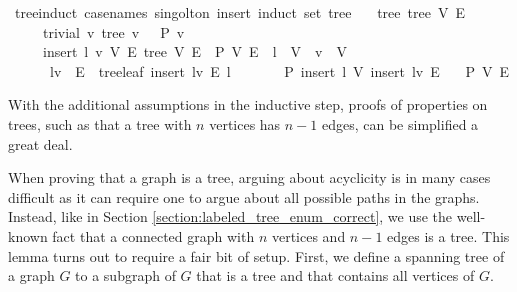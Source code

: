 \begin{isabellebox}
    \isamarkupfalse%
    \ tree{\isacharunderscore}{\kern0pt}induct\ {\isacharbrackleft}{\kern0pt}case{\isacharunderscore}{\kern0pt}names\ singolton\ insert{\isacharcomma}{\kern0pt}\ induct\ set{\isacharcolon}{\kern0pt}\ tree{\isacharbrackright}{\kern0pt}{\isacharcolon}{\kern0pt}\isanewline
    \ \ \ tree{\isacharcolon}{\kern0pt}\ {\isachardoublequoteopen}tree\ V\ E{\isachardoublequoteclose}\isanewline
    \ \ \ \ \ trivial{\isacharcolon}{\kern0pt}\ {\isachardoublequoteopen}{\isasymAnd}v{\isachardot}{\kern0pt}\ tree\ {\isacharbraceleft}{\kern0pt}v{\isacharbraceright}{\kern0pt}\ {\isacharbraceleft}{\kern0pt}{\isacharbraceright}{\kern0pt}\ {\isasymLongrightarrow}\ P\ {\isacharbraceleft}{\kern0pt}v{\isacharbraceright}{\kern0pt}\ {\isacharbraceleft}{\kern0pt}{\isacharbraceright}{\kern0pt}{\isachardoublequoteclose}\isanewline
    \ \ \ \ \ insert{\isacharcolon}{\kern0pt}\ {\isachardoublequoteopen}{\isasymAnd}l\ v\ V\ E{\isachardot}{\kern0pt}\ tree\ V\ E\ {\isasymLongrightarrow}\ P\ V\ E\ {\isasymLongrightarrow}\ l\ {\isasymnotin}\ V\ {\isasymLongrightarrow}\ v\ {\isasymin}\ V\ {\isasymLongrightarrow}\isanewline
    \ \ \ \ \ \ {\isacharbraceleft}{\kern0pt}l{\isacharcomma}{\kern0pt}v{\isacharbraceright}{\kern0pt}\ {\isasymnotin}\ E\ {\isasymLongrightarrow}\ tree{\isachardot}{\kern0pt}leaf\ {\isacharparenleft}{\kern0pt}insert\ {\isacharbraceleft}{\kern0pt}l{\isacharcomma}{\kern0pt}v{\isacharbraceright}{\kern0pt}\ E{\isacharparenright}{\kern0pt}\ l\ {\isasymLongrightarrow}\isanewline
    \ \ \ \ \ \ P\ {\isacharparenleft}{\kern0pt}insert\ l\ V{\isacharparenright}{\kern0pt}\ {\isacharparenleft}{\kern0pt}insert\ {\isacharbraceleft}{\kern0pt}l{\isacharcomma}{\kern0pt}v{\isacharbraceright}{\kern0pt}\ E{\isacharparenright}{\kern0pt}{\isachardoublequoteclose}\isanewline
    \ \ \ {\isachardoublequoteopen}P\ V\ E{\isachardoublequoteclose}
\end{isabellebox}

With the additional assumptions in the inductive step, proofs of properties on trees, such as that a tree with $n$ vertices has $n-1$ edges, can be simplified a great deal.

When proving that a graph is a tree, arguing about acyclicity is in many cases difficult as it can require one to argue about all possible paths in the graphs.
Instead, like in Section \ref{section:labeled_tree_enum_correct}, we use the well-known fact that a connected graph with $n$ vertices and $n-1$ edges is a tree.
This lemma turns out to require a fair bit of setup.
First, we define a spanning tree of a graph $G$ to a subgraph of $G$ that is a tree and that contains all vertices of $G$.

